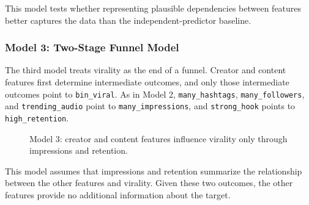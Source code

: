 \documentclass{article}
\begin{document}
This model tests whether representing plausible dependencies between features
better captures the data than the independent-predictor baseline.

\subsubsection{Model 3: Two-Stage Funnel Model}
The third model treats virality as the end of a funnel. Creator and content
features first determine intermediate outcomes, and only those intermediate
outcomes point to \texttt{bin\_viral}. As in Model 2,
\texttt{many\_hashtags}, \texttt{many\_followers}, and
\texttt{trending\_audio} point to \texttt{many\_impressions}, and
\texttt{strong\_hook} points to \texttt{high\_retention}.

\begin{figure}[H]
  \centering
  \caption{Model 3: creator and content features influence virality only
  through impressions and retention.}
  \label{fig:model-funnel}
\end{figure}

This model assumes that impressions and retention summarize the relationship
between the other features and virality. Given these two outcomes, the other
features provide no additional information about the target.
\end{document}
